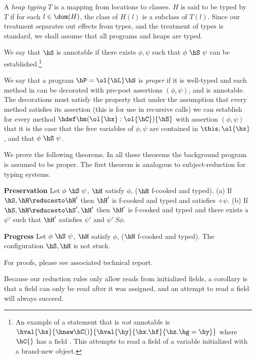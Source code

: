 A {\em heap typing} $T$ is a mapping from locations to classes. $H$ is
said to be typed by $T$ if for each $l\in\dom(H)$, the class of $H(l)$
is a subclass of $T(l)$.  Since our treatment separates out effects
from types, and the treatment of types is standard, we shall assume
that all programs and heaps are typed.

We say that $\hS$ is annotable if there exists $\phi,\psi$ such that
$\phi~\hS~\psi$ can be established.\footnote{An example of a statement that is
{\em not} annotable is $\hval{\hx}{\hnew
  \hC()}{\hval{\hy}{\hx.\hf}{\hz.\hg=\hy}}$ where $\hC{}$ has a field
\hf. This attempts to read a field of a variable initialized with a
brand-new object.}

We say that a program $\hP=\ol{\hL}\hS$ is {\em proper} if it is
well-typed and each method in \hL{} can be decorated with pre-post assertions
$(\phi,\psi)$, and \hS is annotable. 
The decorations must satisfy the property that under the
assumption that every method satisfies its assertion (this is for use
in recursive calls) we can establish for every method
$\hdef\hm(\ol{\hx}:\ol{\hC})\{\hS\}$ with assertion $(\phi,\psi)$ that
it is the case that the free variables of $\phi,\psi$ are contained in
$\this,\ol{\hx}$, and that $\phi~\hS~\psi$.

We prove the following theorems. In all these theorems the background
program \hP{} is assumed to be proper. The first theorem is analogous
to subject-reduction for typing systems.
\begin{Theorem}{\textbf{Preservation}}
Let $\phi~\hS~\psi$, $\hH$ satisfy $\phi$, ($\hH$ f-cooked and typed).
(a) If $\hS,\hH \reducesto \hH'$ then $\hH'$ is f-cooked and typed and satisfies $+\psi$. 
(b) If $\hS,\hH \reducesto \hS',\hH'$ then $\hH'$ is f-cooked and typed and
there exists a $\psi'$ such
that $\hH'$ satisfies $\psi'$ and $\psi'~S\phi$.
\end{Theorem}

\begin{Theorem}{\textbf{Progress}}
 Let $\phi~\hS~\psi$, $\hH$ satisfy $\phi$, ($\hH$ f-cooked and
 typed). The configuration $\hS,\hH$ is not stuck.
\end{Theorem}

For proofs, please see associated technical report.

Because our reduction rules only allow reads from initialized fields,
a corollary is that a field can only be read after it was assigned,
and an attempt to read a field will always succeed.
